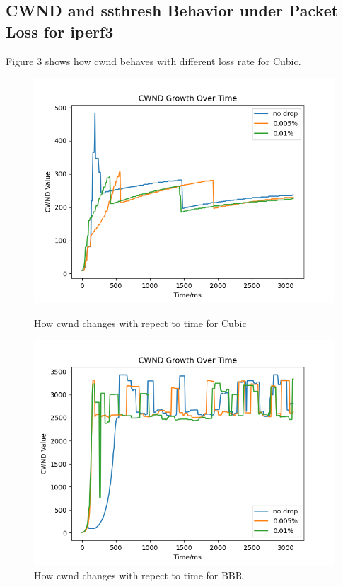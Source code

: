 \documentclass{article}
\begin{document}
\subsection{CWND and ssthresh Behavior under Packet Loss for iperf3}
Figure $3$ shows how cwnd behaves with different loss rate for Cubic. 
\begin{figure}[h]
    \begin{minipage}[b]{0.45\textwidth}
        \centering
        \includegraphics[width=\textwidth]{../figure/cubic_cwnd_drop.png}
        \caption{How cwnd changes with repect to time for Cubic}
        \label{fig:fig3}
    \end{minipage}
    \hfill
    \begin{minipage}[b]{0.45\textwidth}
        \centering
        \includegraphics[width=\textwidth]{../figure/BBR_cwnd_drop.png}
        \caption{How cwnd changes with repect to time for BBR}
        \label{fig:fig4}
    \end{minipage}
\end{figure}
\end{document}
